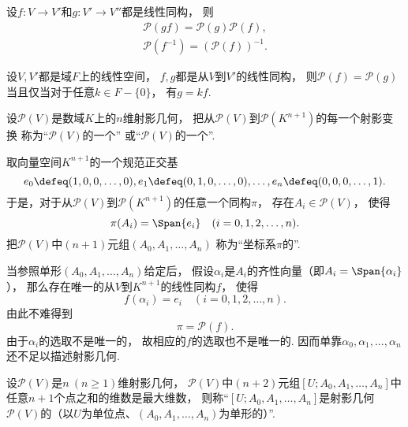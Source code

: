 \begin{property}%
设\(f\colon V \to V'\)和\(g\colon V' \to V''\)都是线性同构，
则\begin{gather*}
	\mathcal{P}(gf) = \mathcal{P}(g) \mathcal{P}(f), \\
	\mathcal{P}(f^{-1}) = (\mathcal{P}(f))^{-1}.
\end{gather*}
\end{property}

\begin{theorem}%
设\(V,V'\)都是域\(F\)上的线性空间，
\(f,g\)都是从\(V\)到\(V'\)的线性同构，
则\(\mathcal{P}(f) = \mathcal{P}(g)\)
当且仅当对于任意\(k \in F - \{0\}\)，
有\(g = k f\).
\end{theorem}

\begin{definition}
设\(\mathcal{P}(V)\)是数域\(K\)上的\(n\)维射影几何，
把从\(\mathcal{P}(V)\)到\(\mathcal{P}(K^{n+1})\)的每一个射影变换
称为“\(\mathcal{P}(V)\)的一个”
或“\(\mathcal{P}(V)\)的一个”.
\end{definition}

取向量空间\(K^{n+1}\)的一个规范正交基\begin{equation*}
	e_0 \defeq (1,0,0,\dotsc,0),
	e_1 \defeq (0,1,0,\dotsc,0),
	\dotsc,
	e_n \defeq (0,0,0,\dotsc,1).
\end{equation*}
于是，对于从\(\mathcal{P}(V)\)到\(\mathcal{P}(K^{n+1})\)的任意一个同构\(\pi\)，
存在\(A_i \in \mathcal{P}(V)\)，
使得\begin{equation*}
	\pi(A_i) = \Span\{e_i\}
	\quad(i=0,1,2,\dotsc,n).
\end{equation*}
把\(\mathcal{P}(V)\)中\((n+1)\)元组\((A_0,A_1,\dotsc,A_n)\)
称为“坐标系\(\pi\)的”.

当参照单形\((A_0,A_1,\dotsc,A_n)\)给定后，
假设\(\alpha_i\)是\(A_i\)的齐性向量（即\(A_i = \Span\{\alpha_i\}\)），
那么存在唯一的从\(V\)到\(K^{n+1}\)的线性同构\(f\)，
使得\begin{equation*}
	f(\alpha_i) = e_i
	\quad(i=0,1,2,\dotsc,n).
\end{equation*}
由此不难得到\begin{equation*}
	\pi = \mathcal{P}(f).
\end{equation*}
由于\(\alpha_i\)的选取不是唯一的，
故相应的\(f\)的选取也不是唯一的.
因而单靠\(\alpha_0,\alpha_1,\dotsc,\alpha_n\)还不足以描述射影几何.

\begin{definition}
设\(\mathcal{P}(V)\)是\(n\ (n\geq1)\)维射影几何，
\(\mathcal{P}(V)\)中\((n+2)\)元组\([U;A_0,A_1,\dotsc,A_n]\)中
任意\(n+1\)个点之和的维数是最大维数，
则称“\([U;A_0,A_1,\dotsc,A_n]\)是射影几何\(\mathcal{P}(V)\)的（以\(U\)为单位点、\((A_0,A_1,\dotsc,A_n)\)为单形的）”.
\end{definition}
